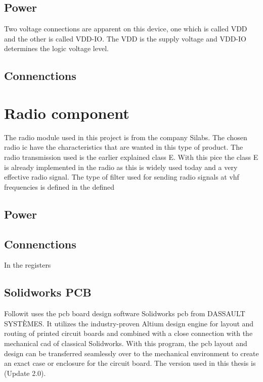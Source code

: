 \subsection{Power}
Two voltage connections are apparent on this device, one which is called VDD and the other is called VDD-IO. The VDD is the supply voltage and VDD-IO determines the logic voltage level. 


\subsection{Connenctions}


\newpage
\section{Radio component}
 The radio module used in this project is from the company Silabs. The chosen radio \gls{ic} have the characteristics that are wanted in this type of product. The radio transmission used is the earlier explained class E. With this pice the class E is already implemented in the radio as this is widely used today and a very effective radio signal. 
The type of filter used for sending radio signals at \gls{vhf} frequencies is defined in the defined 


\subsection{Power}


\subsection{Connenctions}
 In the registers 


\newpage
\subsection{Solidworks PCB}
Followit uses the \gls{pcb} board design software Solidworks \gls{pcb} from DASSAULT SYSTÈMES. It utilizes the industry-proven Altium design engine for layout and routing of printed circuit boards and combined with a close connection with the mechanical \gls{cad} of classical Solidworks. With this program, the \gls{pcb} layout and design can be transferred seamlessly over to the mechanical environment to create an exact case or enclosure for the circuit board. The version used in this thesis is (Update 2.0).


